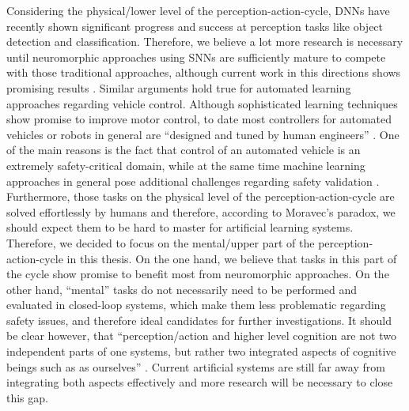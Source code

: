 Considering the physical/lower level of the perception-action-cycle, \acp{DNN} have recently shown significant progress and success at perception tasks like object detection and classification.
Therefore, we believe a lot more research is necessary until neuromorphic approaches using \acp{SNN} are sufficiently mature to compete with those traditional approaches, although current work in this directions shows promising results \parencite{Hunsberger2015}.
Similar arguments hold true for automated learning approaches regarding vehicle control.
Although sophisticated learning techniques show promise to improve motor control, to date most controllers for automated vehicles or robots in general are \enquote{designed and tuned by human engineers} \parencite{Deisenroth2013}.
One of the main reasons is the fact that control of an automated vehicle is an extremely safety-critical domain, while at the same time machine learning approaches in general pose additional challenges regarding safety validation \parencite{Koopman2016}.
Furthermore, those tasks on the physical level of the perception-action-cycle are solved effortlessly by humans and therefore, according to Moravec's paradox, we should expect them to be hard to master for artificial learning systems.
Therefore, we decided to focus on the mental/upper part of the perception-action-cycle in this thesis.
On the one hand, we believe that tasks in this part of the cycle show promise to benefit most from neuromorphic approaches.
On the other hand, \enquote{mental} tasks do not necessarily need to be performed and evaluated in closed-loop systems, which make them less problematic regarding safety issues, and therefore ideal candidates for further investigations.
It should be clear however, that \enquote{perception/action and higher level cognition are not two independent parts of one systems, but rather two integrated aspects of cognitive beings such as as ourselves} \parencite{Eliasmith2013}.
Current artificial systems are still far away from integrating both aspects effectively and more research will be necessary to close this gap.

